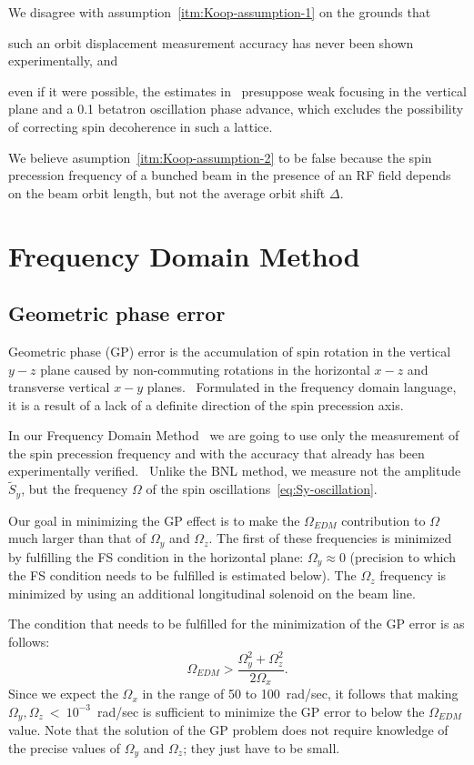 \documentclass[a4paper]{jpconf}
\newcommand{\W}{\Omega}
\begin{document}
We disagree with assumption~\ref{itm:Koop-assumption-1} on the grounds that
\begin{enumerate*}[(a)]
	\item such an orbit displacement measurement accuracy has never been shown experimentally, and
	\item even if it were possible, the estimates in~\cite{Kawall} presuppose weak focusing in the vertical plane and a 0.1 betatron oscillation phase advance, which excludes the possibility of correcting spin decoherence in such a lattice.
\end{enumerate*}

We believe asumption~\ref{itm:Koop-assumption-2} to be false because the spin precession frequency of a bunched beam in the presence of an RF field depends on the beam orbit length, but not the average orbit shift $\Delta$.

\section{Frequency Domain Method}
\subsection{Geometric phase error}
Geometric phase (GP) error is the accumulation of spin rotation in the vertical $y-z$ plane caused by non-commuting rotations in the horizontal $x-z$ and transverse vertical $x-y$ planes.~\cite[p.~23]{AGS-proposal-deuteron} Formulated in the frequency domain language, it is a result of a lack of a definite direction of the spin precession axis. 

In our Frequency Domain Method~\cite{Senichev:FDM} we are going to use only the measurement of the spin precession frequency and with the accuracy that already has been experimentally verified.~\cite{Bagdasarian} Unlike the BNL method, we measure not the amplitude $\tilde S_y$, but the frequency $\W$ of the spin oscillations~\eqref{eq:Sy-oscillation}.

Our goal in minimizing the GP effect is to make the $\W_{EDM}$ contribution to $\W$ much larger than that of $\W_y$ and $\W_z$. The first of these frequencies is minimized by fulfilling the FS condition in the horizontal plane: $\W_y\approx0$ (precision to which the FS condition needs to be fulfilled is estimated below). The $\W_z$ frequency is minimized by using an additional longitudinal solenoid on the beam line. 

The condition that needs to be fulfilled for the minimization of the GP error is as follows:~\cite[p.~4]{Senichev:FDM}
\begin{equation}\label{eq:GP-minimization-condition}
\W_{EDM} > \frac{\W_y^2 + \W_z^2}{2\W_x}.
\end{equation}
Since we expect the $\W_x$ in the range of 50 to 100~rad/sec, it follows that making $\W_y,\W_z~<~10^{-3}$~rad/sec is sufficient to minimize the GP error to below the $\W_{EDM}$ value. Note that the solution of the GP problem does not require knowledge of the precise values of $\W_y$ and $\W_z$; they just have to be small.
\end{document}

